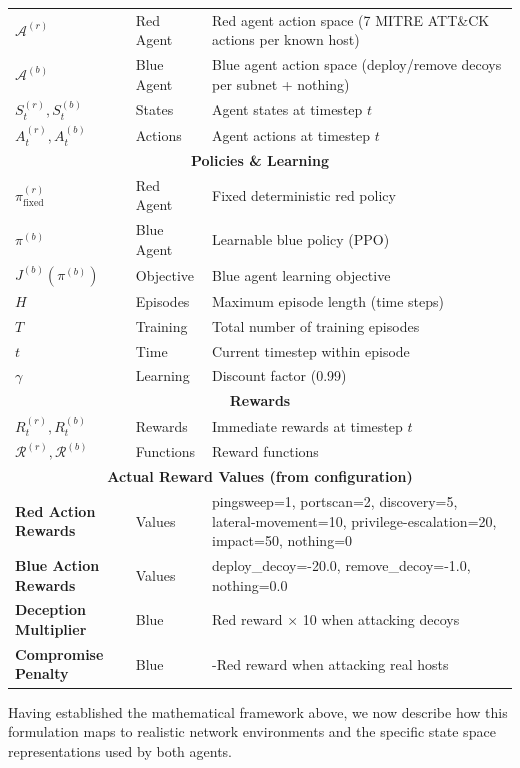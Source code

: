 \documentclass[12pt,oneside]{article}
\begin{document}
\begin{table}[H]
\begin{tabular}{|l|l|p{6cm}|}
$\mathcal{A}^{(r)}$ & Red Agent & Red agent action space (7 MITRE ATT\&CK actions per known host) \\
$\mathcal{A}^{(b)}$ & Blue Agent & Blue agent action space (deploy/remove decoys per subnet + nothing) \\
$S_t^{(r)}, S_t^{(b)}$ & States & Agent states at timestep $t$ \\
$A_t^{(r)}, A_t^{(b)}$ & Actions & Agent actions at timestep $t$ \\
\hline
\multicolumn{3}{|c|}{\textbf{Policies \& Learning}} \\
\hline
$\pi^{(r)}_{\text{fixed}}$ & Red Agent & Fixed deterministic red policy \\
$\pi^{(b)}$ & Blue Agent & Learnable blue policy (PPO) \\
$J^{(b)}(\pi^{(b)})$ & Objective & Blue agent learning objective \\
$H$ & Episodes & Maximum episode length (time steps) \\
$T$ & Training & Total number of training episodes \\
$t$ & Time & Current timestep within episode \\
$\gamma$ & Learning & Discount factor (0.99) \\
\hline
\multicolumn{3}{|c|}{\textbf{Rewards}} \\
\hline
$R_t^{(r)}, R_t^{(b)}$ & Rewards & Immediate rewards at timestep $t$ \\
$\mathcal{R}^{(r)}, \mathcal{R}^{(b)}$ & Functions & Reward functions \\
\multicolumn{3}{|c|}{\textbf{Actual Reward Values (from configuration)}} \\
\hline
\textbf{Red Action Rewards} & Values & pingsweep=1, portscan=2, discovery=5, lateral-movement=10, privilege-escalation=20, impact=50, nothing=0 \\
\textbf{Blue Action Rewards} & Values & deploy\_decoy=-20.0, remove\_decoy=-1.0, nothing=0.0 \\
\textbf{Deception Multiplier} & Blue & Red reward × 10 when attacking decoys \\
\textbf{Compromise Penalty} & Blue & -Red reward when attacking real hosts \\
\hline
\end{tabular}
\end{table}

Having established the mathematical framework above, we now describe how this formulation maps to realistic network environments and the specific state space representations used by both agents.
\end{document}
